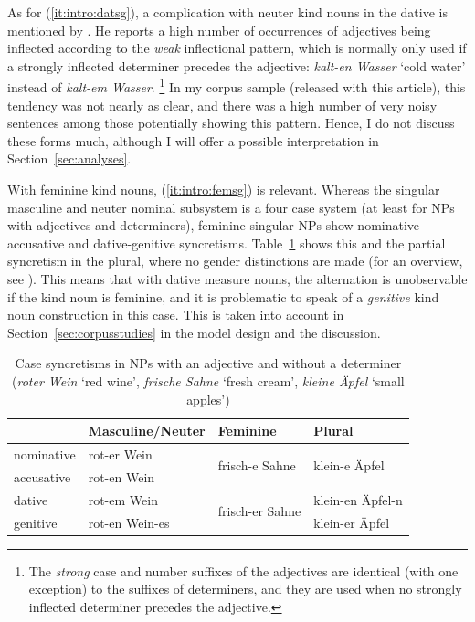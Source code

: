 \documentclass[USenglish]{article}
\begin{document}
As for (\ref{it:intro:datsg}), a complication with neuter kind nouns in the dative is mentioned by \citet[20--22]{Zimmer2015}.
He reports a high number of occurrences of adjectives being inflected according to the \textit{weak} inflectional pattern, which is normally only used if a strongly inflected determiner precedes the adjective: \textit{kalt-en Wasser} `cold water' instead of \textit{kalt-em Wasser}.%
\footnote{\label{fn:strongweak}The \textit{strong} case and number suffixes of the adjectives are identical (with one exception) to the suffixes of determiners, and they are used when no strongly inflected determiner precedes the adjective.}
In my corpus sample (released with this article), this tendency was not nearly as clear, and there was a high number of very noisy sentences among those potentially showing this pattern.
Hence, I do not discuss these forms much, although I will offer a possible interpretation in Section~\ref{sec:analyses}.

\label{page:femininesyncretism}
With feminine kind nouns, (\ref{it:intro:femsg}) is relevant.
Whereas the singular masculine and neuter nominal subsystem is a four case system (at least for NPs with adjectives and determiners), feminine singular NPs show nominative-accusative and dative-genitive syncretisms.
Table~\ref{tab:syncretisms} shows this and the partial syncretism in the plural, where no gender distinctions are made (for an overview, see \citealp[XYZ]{Eisenberg2013a}).
This means that with dative measure nouns, the alternation is unobservable if the kind noun is feminine, and it is problematic to speak of a \textit{genitive} kind noun construction in this case.
This is taken into account in Section~\ref{sec:corpusstudies} in the model design and the discussion.

\begin{table}
  \centering
  \begin{tabular}{llll}
     & Masculine\slash Neuter & Feminine & Plural \\
     \midrule
     nominative & rot-er Wein    & \multirow{2}{*}{frisch-e Sahne}   & \multirow{2}{*}{klein-e Äpfel} \\
     accusative & rot-en Wein    &                                   &                                \\
     dative     & rot-em Wein    & \multirow{2}{*}{frisch-er Sahne}  & klein-en Äpfel-n               \\
     genitive   & rot-en Wein-es &                                   & klein-er Äpfel                 \\
  \end{tabular}
  \caption{Case syncretisms in NPs with an adjective and without a determiner (\textit{roter Wein} `red wine', \textit{frische Sahne} `fresh cream', \textit{kleine Äpfel} `small apples')}
  \label{tab:syncretisms}
\end{table}
\end{document}
